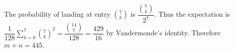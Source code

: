 The probability of landing at entry $\binom7k$ is $\dfrac{\binom7k}{2^7}$. Thus the expectation is $\dfrac{1}{128}\sum_{k=0}^7\binom7k^2=\dfrac{\binom{14}7}{128}=\dfrac{429}{16}$ by Vandermonde's identity. Therefore $\boxed{m+n=445}$.
